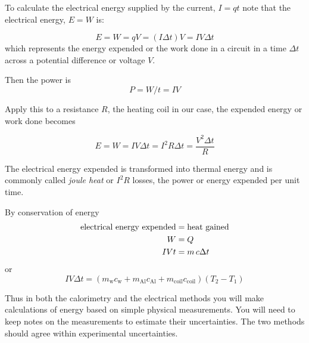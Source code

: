 To calculate the electrical energy supplied by the current, $I=q t$ note that the electrical energy, $E = W$ is: %

\begin{equation}
	\label{e:iheat} E = W = qV = (I\Delta t)V = IV\Delta t
\end{equation}
which represents the energy expended or the work done in a circuit in a time  $\Delta t$ across a potential difference or voltage $V$.	


Then the power is 
\begin{equation}\label{e:power} P = W/t = IV \end{equation}

Apply this to a resistance $R$, the heating coil in our case, the expended energy or work done becomes

\begin{equation}\label{e:eWork} 
E = W = IV\Delta t = I^2R\Delta t = \frac{V^2\Delta t}{R} 
\end{equation}

The electrical energy expended is transformed into thermal energy and is commonly called \textit{joule heat} or $I^2 R$ losses, the power or energy expended per unit time.

By conservation of energy
\begin{align} 
\text{electrical energy expended} & = \text{heat gained} \notag \\
W & = Q \notag \\
IVt & = m\,c\Delta t \notag
\end{align}
or
\begin{equation}
IV\Delta t = \left(m_{\textrm{w}}c_{\textrm{w}} + m_{\textrm{Al}}c_{\textrm{Al}} + m_{\textrm{coil}}c_{\textrm{coil}}\right)\left(T_2 - T_1\right)
\end{equation}

Thus in both the calorimetry and the electrical methods you will make calculations of energy based on simple physical measurements.  You will need to keep notes on the measurements to estimate their uncertainties.  The two methods should agree within experimental uncertainties.

